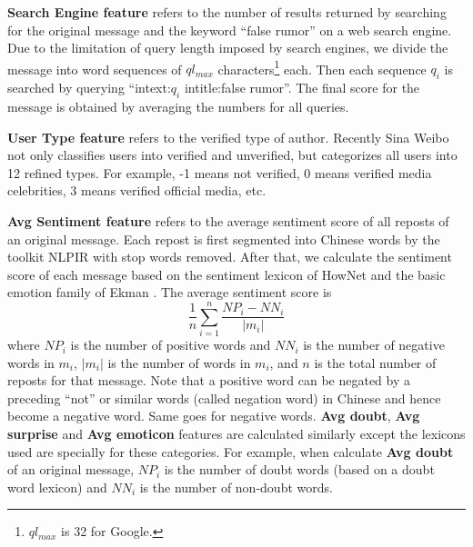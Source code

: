 
\textbf{Search Engine feature} refers to the number of
results returned by searching for the original message and the
keyword ``false rumor'' on a web search engine.
Due to the limitation of query length imposed by search engines,
we divide the message into word sequences of $ql_{max}$ characters\footnote{$ql_{max}$ is 32 for Google.} each.
Then each sequence $q_i$ is searched by querying
``intext:$q_i$ intitle:false rumor''.
The final score for the message is obtained
by averaging the numbers for all queries.

\textbf{User Type feature} refers to the verified type of author.
Recently Sina Weibo not only classifies users into verified and unverified,
but categorizes all users into 12 refined types.
For example, -1 means not verified, 0 means verified media celebrities,
3 means verified official media, etc.

\textbf{Avg Sentiment feature} refers to the average sentiment score
of all reposts of an original message.
Each repost is first segmented into Chinese words by the toolkit
NLPIR \cite{Zhang2014} with stop words removed.
After that, we calculate the sentiment score of each message based
on the sentiment lexicon of HowNet \cite{Dong2007} and the basic emotion
family of Ekman \cite{ekman1992argument}.
The average sentiment score is
\begin{equation}
\frac{1}{n}\sum_{i=1}^n \frac{NP_i - NN_i}{|m_i|}
\end{equation}
where $NP_i$ is the number of positive words and $NN_i$ is the number of
negative words in $m_i$, $|m_i|$ is the number of words in $m_i$,
and $n$ is the total number of reposts for that message.
Note that a positive word can be negated by a preceding
``not'' or similar words (called negation word)
in Chinese and hence become a negative word.
Same goes for negative words.
\textbf{Avg doubt}, {\bf Avg surprise} and \textbf{Avg emoticon} features
are calculated similarly except the lexicons used are specially
for these categories. For example, when calculate \textbf{Avg doubt}
of an original message, $NP_i$ is the number of doubt words
(based on a doubt word lexicon) and $NN_i$ is the number of non-doubt words.

